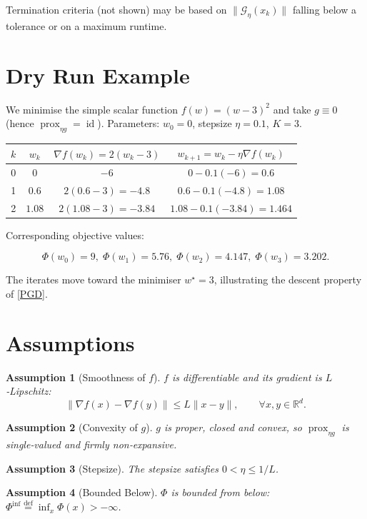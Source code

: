 \documentclass{article}
\newtheorem{assumption}{Assumption}
\begin{document}
Termination criteria (not shown) may be based on $\|\mathcal{G}_{\eta}(x_k)\|$ falling below a tolerance or on a maximum runtime.

\section*{Dry Run Example}
We minimise the simple scalar function $f(w)=(w-3)^{2}$ and take $g\equiv0$ (hence $\operatorname{prox}_{\eta g}= \operatorname{id}$).  
Parameters: $w_{0}=0$, stepsize $\eta=0.1$, $K=3$.

\begin{center}
\begin{tabular}{c|c|c|c}
$k$ & $w_k$ & $\nabla f(w_k)=2(w_k-3)$ & $w_{k+1}=w_k-\eta\nabla f(w_k)$ \\\hline
0 & $0$ & $-6$ & $0-0.1(-6)=0.6$ \\
1 & $0.6$ & $2(0.6-3)=-4.8$ & $0.6-0.1(-4.8)=1.08$ \\
2 & $1.08$ & $2(1.08-3)=-3.84$ & $1.08-0.1(-3.84)=1.464$ \\
\end{tabular}
\end{center}

Corresponding objective values:  

\[
\Phi(w_0)=9,\;\Phi(w_1)=5.76,\;\Phi(w_2)=4.147,\;\Phi(w_3)=3.202.
\]

The iterates move toward the minimiser $w^{\star}=3$, illustrating the descent property of \eqref{PGD}.

\newpage

\section*{Assumptions}
\begin{assumption}[Smoothness of $f$]\label{ass:smooth}
$f$ is differentiable and its gradient is $L$‑Lipschitz:
\[
\|\nabla f(x)-\nabla f(y)\|\le L\|x-y\|,\qquad\forall x,y\in\mathbb{R}^{d}.
\]
\end{assumption}
\begin{assumption}[Convexity of $g$]\label{ass:convex}
$g$ is proper, closed and convex, so $\operatorname{prox}_{\eta g}$ is single‑valued and firmly non‑expansive.
\end{assumption}
\begin{assumption}[Stepsize]\label{ass:stepsize}
The stepsize satisfies $0<\eta\le 1/L$.
\end{assumption}
\begin{assumption}[Bounded Below]\label{ass:lower}
$\Phi$ is bounded from below: $\Phi^{\inf}\stackrel{\text{def}}{=}\inf_{x}\Phi(x)>-\infty$.
\end{assumption}
\end{document}
